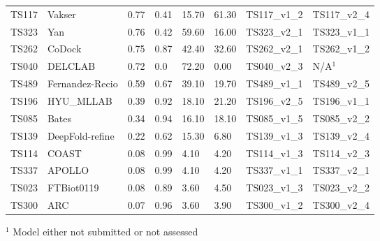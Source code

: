 \begin{table}[ht]
{\begin{tabular}{llllllll}
TS117 & Vakser & 0.77 & 0.41 & 15.70 & 61.30 & TS117\_v1\_2 & TS117\_v2\_4 \\ 
TS323 & Yan & 0.76 & 0.42 & 59.60 & 16.00 & TS323\_v2\_1 & TS323\_v1\_1 \\ 
TS262 & CoDock & 0.75 & 0.87 & 42.40 & 32.60 & TS262\_v2\_1 & TS262\_v1\_2 \\ 
TS040 & DELCLAB & 0.72 & 0.0 & 72.20 & 0.00 & TS040\_v2\_3 & N/A$^{1}$ \\ 
TS489 & Fernandez-Recio & 0.59 & 0.67 & 39.10 & 19.70 & TS489\_v1\_1 & TS489\_v2\_5 \\ 
TS196 & HYU\_MLLAB & 0.39 & 0.92 & 18.10 & 21.20 & TS196\_v2\_5 & TS196\_v1\_1 \\ 
TS085 & Bates & 0.34 & 0.94 & 16.10 & 18.10 & TS085\_v1\_5 & TS085\_v2\_2 \\ 
TS139 & DeepFold-refine & 0.22 & 0.62 & 15.30 & 6.80 & TS139\_v1\_3 & TS139\_v2\_4 \\ 
TS114 & COAST & 0.08 & 0.99 & 4.10 & 4.20 & TS114\_v1\_3 & TS114\_v2\_3 \\ 
TS337 & APOLLO & 0.08 & 0.99 & 4.10 & 4.20 & TS337\_v1\_1 & TS337\_v2\_1 \\ 
TS023 & FTBiot0119 & 0.08 & 0.89 & 3.60 & 4.50 & TS023\_v1\_3 & TS023\_v2\_2 \\ 
TS300 & ARC & 0.07 & 0.96 & 3.60 & 3.90 & TS300\_v1\_2 & TS300\_v2\_4 \\ 
\bottomrule
\end{tabular}%
}
\begin{flushleft}\footnotesize $^{1}$ Model either not submitted or not assessed\end{flushleft}
\end{table}
